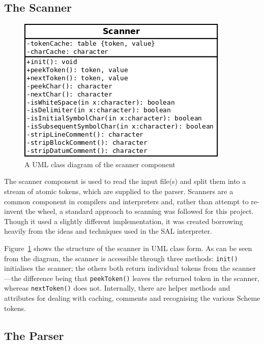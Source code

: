 \subsection{The Scanner}

\begin{figure}
\centering
\includegraphics[width=\textwidth]{scannerUML.png}
\caption{A UML class diagram of the scanner component}
\label{fig:scannerUML}
\end{figure}

The scanner component is used to read the input file(s) and split them into a
stream of atomic tokens, which are supplied to the parser. Scanners are a common
component in compilers and interpreters and, rather than attempt to re-invent
the wheel, a standard approach to scanning was followed for this project.
Though it used a slightly different implementation, it was created borrowing
heavily from the ideas and techniques used in the SAL interpreter\cite{sal}.

Figure~\ref{fig:scannerUML} shows the structure of the scanner in UML class
form. As can be seen from the diagram, the scanner is accessible through three
methods: \texttt{init()} initialises the scanner; the others both return
individual tokens from the scanner---the difference being that
\texttt{peekToken()} leaves the returned token in the scanner, whereas
\texttt{nextToken()} does not. Internally, there are helper methods and
attributes for dealing with caching, comments and recognising the various Scheme
tokens.

\subsection{The Parser}

